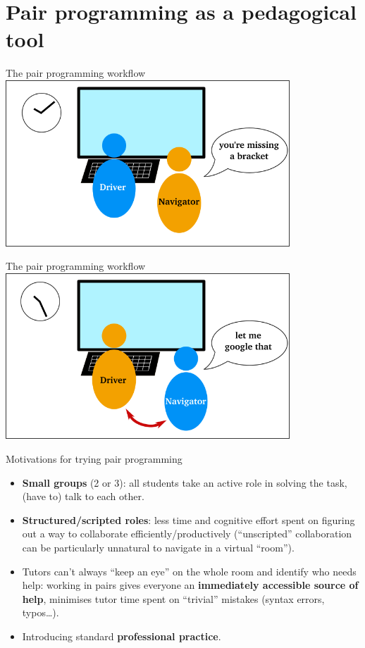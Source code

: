 \documentclass[aspectratio=169, 12pt]{beamer}
\begin{document}
\section{Pair programming as a pedagogical tool}

\begin{frame}{The pair programming workflow}
    \centering
    \includegraphics[width=0.8\textwidth]{graphics/pairprog_1.png}
\end{frame}

\begin{frame}{The pair programming workflow}
    \centering
    \includegraphics[width=0.8\textwidth]{graphics/pairprog_2.png}
\end{frame}

\begin{frame}{Motivations for trying pair programming}
    \begin{itemize}
        \item<1-> \textbf{Small groups} (2 or 3): all students take an active role in solving the task, (have to) talk to each other.
        \item<2-> \textbf{Structured/scripted roles}: less time and cognitive effort spent on figuring out a way to collaborate efficiently/productively (``unscripted'' collaboration can be particularly unnatural to navigate in a virtual ``room'').
        \item<3-> Tutors can't always ``keep an eye'' on the whole room and identify who needs help: working in pairs gives everyone an \textbf{immediately accessible source of help}, minimises tutor time spent on ``trivial'' mistakes (syntax errors, typos\ldots).
        \item<4-> Introducing standard \textbf{professional practice}.
    \end{itemize}
\end{frame}
\end{document}
